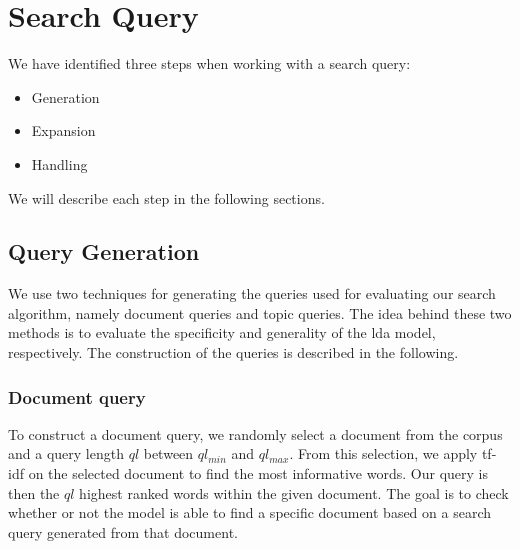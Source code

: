 \section{Search Query}\label{sec:query}

We have identified three steps when working with a search query:
\begin{itemize}
	\item Generation
	\item Expansion
	\item Handling
\end{itemize}
We will describe each step in the following sections.
\subsection{Query Generation}\label{subsec:query_gen}
We use two techniques for generating the queries used for evaluating our search algorithm, namely document queries and topic queries.
The idea behind these two methods is to evaluate the specificity and generality of the \gls{lda} model, respectively.
The construction of the queries is described in the following.

\subsubsection{Document query}\label{subsec:query_gen_doc}
To construct a document query, we randomly select a document from the corpus and a query length $ql$ between $ql_{min}$ and $ql_{max}$.
From this selection, we apply \gls{tf-idf} on the selected document to find the most informative words.
Our query is then the $ql$ highest ranked words within the given document.
The goal is to check whether or not the model is able to find a specific document based on a search query generated from that document.

